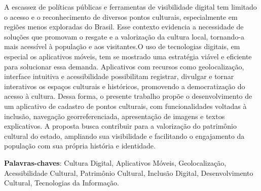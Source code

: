 \begin{resumo}
A escassez de políticas públicas e ferramentas de visibilidade digital tem limitado o acesso e o reconhecimento de diversos pontos culturais, especialmente em regiões menos exploradas do Brasil. Esse contexto evidencia a necessidade de soluções que promovam o resgate e a valorização da cultura local, tornando-a mais acessível à população e aos visitantes.O uso de tecnologias digitais, em especial os aplicativos móveis, tem se mostrado uma estratégia viável e eficiente para solucionar essa demanda. Aplicativos com recursos como geolocalização, interface intuitiva e acessibilidade possibilitam registrar, divulgar e tornar interativos os espaços culturais e históricos, promovendo a democratização do acesso à cultura. Dessa forma, o presente trabalho propõe o desenvolvimento de um aplicativo de cadastro de pontos culturais, com funcionalidades voltadas à inclusão, navegação georreferenciada, apresentação de imagens e textos explicativos. A proposta busca contribuir para a valorização do patrimônio cultural do estado, ampliando sua visibilidade e facilitando o engajamento da população com sua própria história e identidade.

\vspace{\onelineskip}
\noindent
\textbf{Palavras-chaves}: Cultura Digital, Aplicativos Móveis, Geolocalização, Acessibilidade Cultural, Patrimônio Cultural, Inclusão Digital, Desenvolvimento Cultural, Tecnologias da Informação.
\end{resumo}